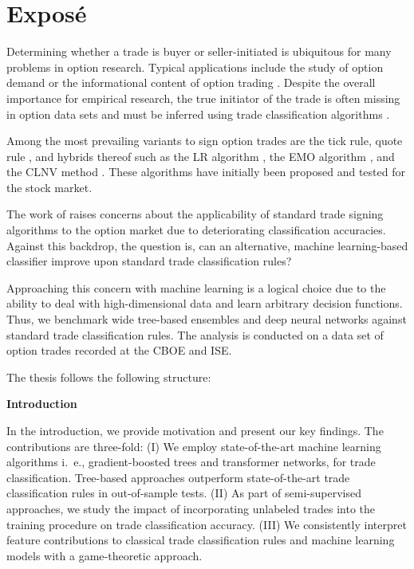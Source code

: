 \section{Exposé}
\label{sec:expose}

Determining whether a trade is buyer or seller-initiated is ubiquitous for many problems in option research. Typical applications include the study of option demand \autocite{garleanuDemandBasedOptionPricing2009} or the informational content of option trading \autocites{huDoesOptionTrading2014}{panInformationOptionVolume2006}. Despite the overall importance for empirical research, the true initiator of the trade is often missing in option data sets and must be inferred using trade classification algorithms \autocite{easleyOptionVolumeStock1998}. 

Among the most prevailing variants to sign option trades are the tick rule, quote rule \autocite{hasbrouckTradesQuotesInventories1988}, and hybrids thereof such as the \gls{LR} algorithm \autocite{leeInferringTradeDirection1991}, the \gls{EMO} algorithm \autocite{ellisAccuracyTradeClassification2000}, and the \gls{CLNV} method \autocite{chakrabartyTradeClassificationAlgorithms2007}. These algorithms have initially been proposed and tested for the stock market.

The work of \textcites{grauerOptionTradeClassification2022}{savickasInferringDirectionOption2003} raises concerns about the applicability of standard trade signing algorithms to the option market due to deteriorating classification accuracies. Against this backdrop, the question is, can an alternative, machine learning-based classifier improve upon standard trade classification rules? 

Approaching this concern with machine learning is a logical choice due to the ability to deal with high-dimensional data and learn arbitrary decision functions. Thus, we benchmark wide tree-based ensembles and deep neural networks against standard trade classification rules. The analysis is conducted on a data set of option trades recorded at the \gls{CBOE} and \gls{ISE}.

The thesis follows the following structure:

\textbf{Introduction}

In the introduction, we provide motivation and present our key findings. The contributions are three-fold: (I) We employ state-of-the-art machine learning algorithms i.~e., gradient-boosted trees and transformer networks, for trade classification. Tree-based approaches outperform state-of-the-art trade classification rules in out-of-sample tests. (II) As part of semi-supervised approaches, we study the impact of incorporating unlabeled trades into the training procedure on trade classification accuracy. (III) We consistently interpret feature contributions to classical trade classification rules and machine learning models with a game-theoretic approach.

